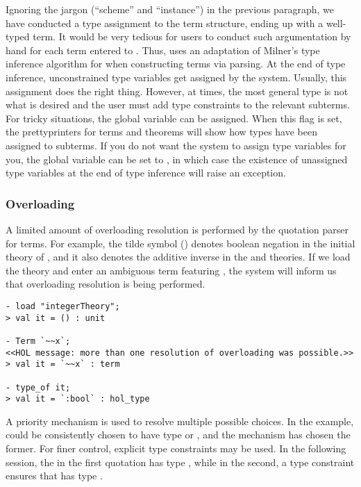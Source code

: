 {Ignoring the jargon (``scheme'' and ``instance'') in the previous
paragraph, we have conducted a type assignment to the term structure,
ending up with a well-typed term. It would be very tedious for users
to conduct such argumentation by hand for each term entered to \HOL{}.
Thus, \HOL{} uses an adaptation of Milner's type inference algorithm
for \ML{} when constructing terms via parsing. At the end of type
inference, unconstrained type variables get assigned by the system.
Usually, this assignment does the right thing. However, at times, the
most general type is not what is desired and the user must add type
constraints to the relevant subterms. For tricky situations, the
global variable  can be assigned. When this flag is
set, the prettyprinters for terms and theorems will show how types
have been assigned to subterms. If you do not want the system to
assign type variables for you, the global variable
 can be set to , in which case the
existence of unassigned type variables at the end of type inference
will raise an exception.

\subsubsection{Overloading}

A limited amount of overloading resolution is performed by the quotation
parser for terms. For example, the tilde symbol (\holtxt{\~{}})
denotes boolean negation in the initial theory of \HOL, and it also denotes
the additive inverse in the  and
 theories. If we load the 
theory and enter an ambiguous term featuring \holtxt{\~{}}, the
system will inform us that overloading resolution is being performed.

\setcounter{sessioncount}{1}
\begin{session}
\begin{verbatim}
- load "integerTheory";
> val it = () : unit

- Term `~~x`;
<<HOL message: more than one resolution of overloading was possible.>>
> val it = `~~x` : term

- type_of it;
> val it = `:bool` : hol_type
\end{verbatim}
\end{session}

A priority mechanism is used to resolve multiple possible choices. In
the example, \holtxt{\~{}} could be consistently chosen to have type
 or , and the
mechanism has chosen the former. For finer control, explicit type
constraints may be used. In the following session, the
 in the first quotation has type ,
while in the second, a type constraint ensures that  has
type .

}
